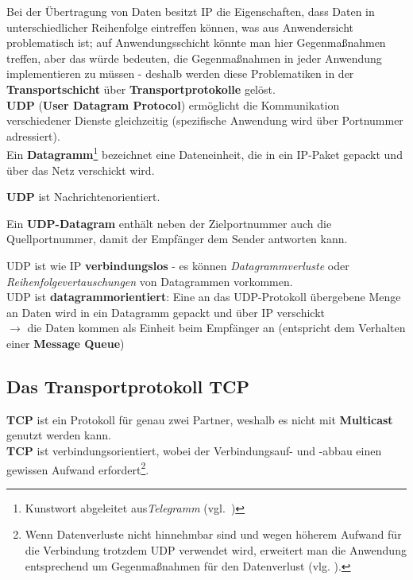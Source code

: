 \noindent
Bei der Übertragung von Daten besitzt IP die Eigenschaften, dass Daten in unterschiedlicher Reihenfolge eintreffen können, was aus Anwendersicht problematisch ist; auf Anwendungsschicht könnte man hier Gegenmaßnahmen treffen, aber das würde bedeuten, die Gegenmaßnahmen in jeder Anwendung implementieren zu müssen - deshalb werden diese Problematiken in der \textbf{Transportschicht} über \textbf{Transportprotokolle} gelöst.\\

\noindent
\textbf{UDP} (\textbf{User Datagram Protocol}) ermöglicht die Kommunikation verschiedener Dienste gleichzeitig (spezifische Anwendung wird über Portnummer adressiert).\\

\noindent
Ein \textbf{Datagramm}\footnote{
Kunstwort abgeleitet aus\textit{Telegramm} (vgl.~\cite[260]{Oec22})
} bezeichnet eine Dateneinheit, die in ein IP-Paket gepackt und über das Netz verschickt wird.

\begin{tcolorbox}[enlarge top by=0.5cm,enlarge bottom by=0.5cm]
\textbf{UDP} ist Nachrichtenorientiert.
\end{tcolorbox}

\noindent
Ein \textbf{UDP-Datagram} enthält neben der Zielportnummer auch die Quellportnummer, damit der Empfänger dem Sender antworten kann.

\noindent
UDP ist wie IP \textbf{verbindungslos} - es können \textit{Datagrammverluste} oder \textit{Reihenfolgevertauschungen} von Datagrammen vorkommen.\\

\noindent
UDP ist \textbf{datagrammorientiert}: Eine an das UDP-Protokoll übergebene Menge an Daten wird in ein Datagramm gepackt und über IP verschickt\\
$\rightarrow$ die Daten kommen als Einheit beim Empfänger an (entspricht dem Verhalten einer \textbf{Message Queue})


\subsection{Das Transportprotokoll TCP}

\textbf{TCP} ist ein Protokoll für genau zwei Partner, weshalb es nicht mit \textbf{Multicast} genutzt werden kann.\\

\noindent
\textbf{TCP} ist verbindungsorientiert, wobei der Verbindungsauf- und -abbau einen gewissen Aufwand erfordert\footnote{
    Wenn Datenverluste nicht hinnehmbar sind und wegen höherem Aufwand für die Verbindung trotzdem UDP verwendet wird, erweitert man die Anwendung entsprechend um Gegenmaßnahmen für den Datenverlust (vlg. \cite[261]{Oec22}).
}.


